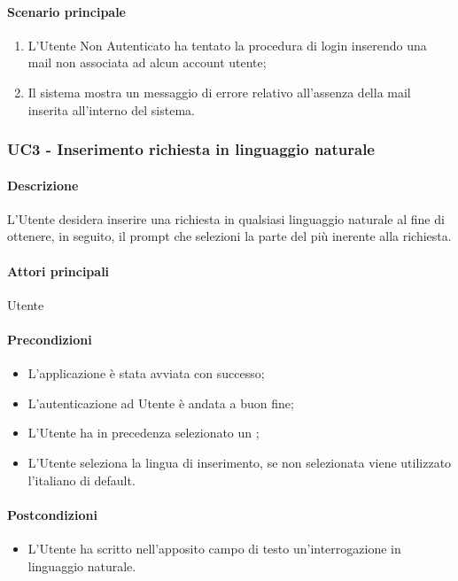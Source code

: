 \paragraph*{Scenario principale}
\begin{enumerate}
  \item L’Utente Non Autenticato ha tentato la procedura di login inserendo una mail non associata ad alcun account utente;
  \item Il sistema mostra un messaggio di errore relativo all’assenza della mail inserita all’interno del sistema.     
\end{enumerate}


\subsubsection{UC3 - Inserimento richiesta in linguaggio naturale}\label{UC3}
\paragraph*{Descrizione}
L’Utente desidera inserire una richiesta in qualsiasi linguaggio naturale al fine di ottenere, in seguito, il prompt che selezioni la parte del  più inerente alla richiesta. 

\paragraph*{Attori principali} Utente

\paragraph*{Precondizioni}
\begin{itemize}
  \item L'applicazione è stata avviata con successo;
  \item L’autenticazione ad Utente è andata a buon fine;
  \item L’Utente ha in precedenza selezionato un ; 
  \item L'Utente seleziona la lingua di inserimento, se non selezionata viene utilizzato l'italiano di default.
\end{itemize}

\paragraph*{Postcondizioni}
\begin{itemize}
  \item L’Utente ha scritto nell’apposito campo di testo un'interrogazione in linguaggio naturale.
\end{itemize}

